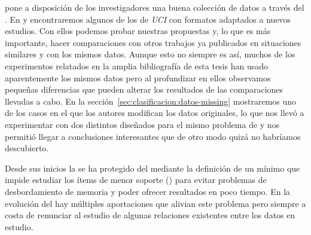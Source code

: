 \citet{Lichman-UCI-2013} pone a disposición de los investigadores una buena colección de datos a través del . En  y  encontraremos algunos de los \datasets de \emph{UCI} con formatos adaptados a nuevos estudios. Con ellos podemos probar nuestras propuestas y, lo que es más importante, hacer comparaciones con otros trabajos ya publicados en situaciones similares y con los mismos datos. Aunque esto no siempre es así, muchos de los experimentos relatados en la amplia bibliografía de esta tesis han usado aparentemente los mismos datos pero al profundizar en ellos observamos pequeñas diferencias que pueden alterar los resultados de las comparaciones llevadas a cabo. En la sección~\ref{sec:clasificacion:datos-missing} mostraremos uno de los casos en el que los autores modifican los datos originales, lo que nos llevó a experimentar con dos \datasets distintos diseñados para el mismo problema de \clasificacion y nos permitió llegar a conclusiones interesantes que de otro modo quizá no habríamos descubierto.






Desde sus inicios la \ARM se ha protegido del \dilemaIR mediante la definición de un \soporte mínimo que impide estudiar los ítems de menor soporte (\irs) para evitar problemas de desbordamiento de memoria y poder ofrecer resultados en poco tiempo. En la evolución del \ARM hay múltiples aportaciones que alivian este problema pero siempre a costa de renunciar al estudio de algunas relaciones existentes entre los datos en estudio.

